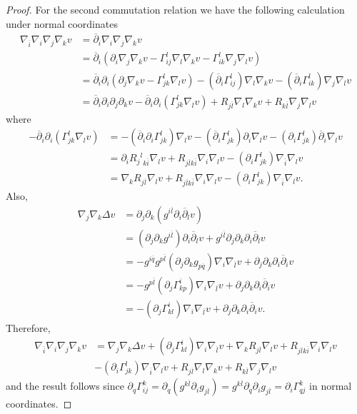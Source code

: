 \documentclass[12pt]{article}
\numberwithin{equation}{section}
\renewcommand{\d}{\partial}
\newcommand{\dbar}{\overline{\partial}}
\newcommand{\oo}[1]{\overline{#1}}
\begin{document}
\begin{proof}
For the second commutation relation we have the following calculation under normal coordinates
\begin{align*}
    \nabla_{\oo{i}} \nabla_i \nabla_j \nabla_k v &= \dbar_i \nabla_i \nabla_j \nabla_k v\\
    &= \dbar_i (\d_i \nabla_j \nabla_k v - \Gamma^l_{ij} \nabla_l \nabla_k v-\Gamma^l_{ik} \nabla_j \nabla_l v)\\
    &= \dbar_i \d_i (\d_j \nabla_k v - \Gamma^{l}_{jk} \nabla_l v) - (\dbar_i \Gamma^l_{ij}) \nabla_l \nabla_k v - (\dbar_i \Gamma^l_{ik}) \nabla_j \nabla_l v\\
    &= \dbar_i \d_i \d_j \d_k v - \dbar_i \d_i (\Gamma^{l}_{jk} \nabla_l v) + R_{j\oo{l}} \nabla_l \nabla_k v + R_{k\oo{l}} \nabla_j \nabla_l v
\end{align*}
where
\begin{align*}
    -\dbar_i \d_i (\Gamma^l_{jk} \nabla_l v) &= -(\dbar_i \d_i \Gamma^l_{jk}) \nabla_l v -(\dbar_i \Gamma^l_{jk}) \d_i \nabla_l v - (\d_i \Gamma^l_{jk}) \dbar_i \nabla_l v\\
    &= \d_i R_{j}{}^{l}{}_{k\oo{i}} \nabla_l v + R_{j\oo{l}k\oo{i}} \nabla_i \nabla_l v - (\d_i \Gamma^l_{jk}) \nabla_{\oo{i}} \nabla_l v\\
    &= \nabla_k R_{j\oo{l}} \nabla_l v + R_{j\oo{l}k\oo{i}} \nabla_i \nabla_l v - (\d_i \Gamma^l_{jk}) \nabla_{\oo{i}} \nabla_l v.
\end{align*}
Also,
\begin{align*}
    \nabla_j \nabla_k \Delta v &= \d_j \d_k (g^{i\oo{l}} \d_i \dbar_l v)\\
    &= (\d_j \d_k g^{i\oo{l}}) \d_i \dbar_l v + g^{i\oo{l}}\d_j \d_k \d_i \dbar_l v\\
    &= -g^{i\oo{q}} g^{p\oo{l}} (\d_j \d_k g_{p\oo{q}}) \nabla_i \nabla_{\oo{l}} v + \d_j \d_k \d_i \dbar_i v\\
    &= -g^{p\oo{l}}(\d_j \Gamma^{i}_{kp}) \nabla_i \nabla_{\oo{l}} v + \d_j \d_k \d_i \dbar_i v\\
    &=-(\d_j \Gamma^{i}_{kl}) \nabla_i \nabla_{\oo{l}} v + \d_j \d_k \d_i \dbar_i v.
\end{align*}
Therefore,
\begin{align*}
    \nabla_{\oo{i}} \nabla_i \nabla_j \nabla_k v &= \nabla_j \nabla_k \Delta v + (\d_j \Gamma^i_{kl}) \nabla_i \nabla_{\oo{l}} v+\nabla_k R_{j\oo{l}} \nabla_l v + R_{j\oo{l}k\oo{i}} \nabla_i \nabla_l v\\
    &-(\d_i \Gamma^l_{jk})\nabla_{\oo{i}} \nabla_l v +R_{j\oo{l}} \nabla_l \nabla_k v + R_{k\oo{l}} \nabla_j \nabla_l v
\end{align*}
and the result follows since $\d_q \Gamma^k_{ij} = \d_q (g^{k\oo{l}} \d_i g_{j\oo{l}}) = g^{k\oo{l}} \d_q\d_i g_{j\oo{l}} = \d_i \Gamma^k_{qj}$ in normal coordinates.
\end{proof}
\end{document}
